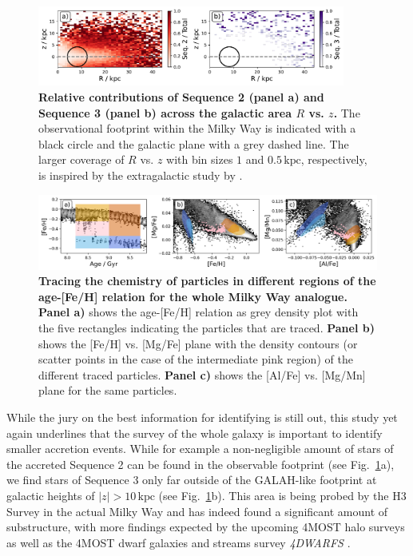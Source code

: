 \documentclass[fleqn,usenatbib]{mnras}
\begin{document}
\begin{figure}
	\includegraphics[width=0.9\textwidth]{figures/accretion_rates.pdf}
    \caption{
    \textbf{Relative contributions of Sequence 2 (panel a) and Sequence 3 (panel b) across the galactic area $R$ vs. $z$.} The observational footprint within the Milky Way is indicated with a black circle and the galactic plane with a grey dashed line. The larger coverage of $R$ vs. $z$ with bin sizes $1$ and $0.5\,\mathrm{kpc}$, respectively, is inspired by the extragalactic study by \citet[][their Fig.~16]{Martig2021}.
    }
    \label{fig:accretion_rate}
\end{figure}

\begin{figure}
	\includegraphics[width=\textwidth]{figures/tracing_amr_regions_footprint.png}
\caption{
    \textbf{Tracing the chemistry of particles in different regions of the age-[Fe/H] relation for the whole Milky Way analogue.}
    \textbf{Panel a)} shows the age-[Fe/H] relation as grey density plot with the five rectangles indicating the particles that are traced.
    \textbf{Panel b)} shows the [Fe/H] vs. [Mg/Fe] plane with the density contours (or scatter points in the case of the intermediate pink region) of the different traced particles.
    \textbf{Panel c)} shows the [Al/Fe] vs. [Mg/Mn] plane for the same particles.
    }    \label{fig:tracing_amr_regions_footprint}
\end{figure}

While the jury on the best information for identifying is still out, this study yet again underlines that the survey of the whole galaxy is important to identify smaller accretion events. While for example a non-negligible amount of stars of the accreted Sequence 2 can be found in the observable footprint (see Fig.~\ref{fig:accretion_rate}a), we find stars of Sequence 3 only far outside of the GALAH-like footprint at galactic heights of $\vert z \vert > 10\,\mathrm{kpc}$ (see Fig.~\ref{fig:accretion_rate}b). This area is being probed by the H3 Survey \citep{Conroy2019} in the actual Milky Way and has indeed found a significant amount of substructure, with more findings expected by the upcoming 4MOST halo surveys \citep{4MOST_HR_Halo, 4MOST_LR_Halo} as well as the 4MOST dwarf galaxies and streams survey \textit{4DWARFS} \citep{4DWARFS2023}.
\end{document}
